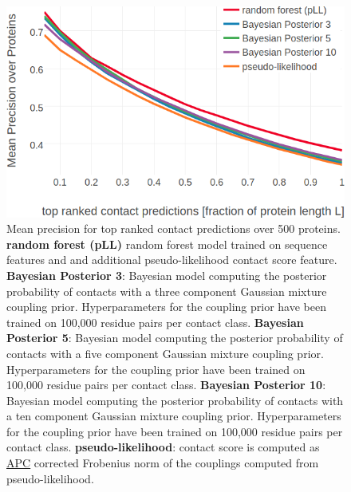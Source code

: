\documentclass[11pt,a4paper,twoside]{book}
\theoremstyle{definition}
\theoremstyle{definition}
\theoremstyle{remark}
\begin{document}
\begin{figure}

{\centering \includegraphics[width=0.9\linewidth]{img/bayesian_model/benchmark/precision_vs_rank_pll_100k_allcomponents} 

}

\caption{Mean precision for top
ranked contact predictions over 500 proteins. \textbf{random forest
(pLL)} random forest model trained on sequence features and and
additional pseudo-likelihood contact score feature. \textbf{Bayesian
Posterior 3}: Bayesian model computing the posterior probability of
contacts with a three component Gaussian mixture coupling prior.
Hyperparameters for the coupling prior have been trained on 100,000
residue pairs per contact class. \textbf{Bayesian Posterior 5}: Bayesian
model computing the posterior probability of contacts with a five
component Gaussian mixture coupling prior. Hyperparameters for the
coupling prior have been trained on 100,000 residue pairs per contact
class. \textbf{Bayesian Posterior 10}: Bayesian model computing the
posterior probability of contacts with a ten component Gaussian mixture
coupling prior. Hyperparameters for the coupling prior have been trained
on 100,000 residue pairs per contact class. \textbf{pseudo-likelihood}:
contact score is computed as \protect\hyperlink{abbrev}{APC} corrected
Frobenius norm of the couplings computed from pseudo-likelihood.}\label{fig:precision-bayesian-model-pll-100k}
\end{figure}
\end{document}
